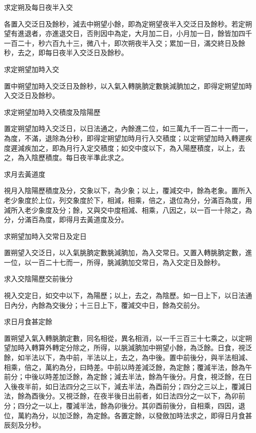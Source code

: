 \begin{pinyinscope}
 求定朔及每日夜半入交



 各置入交泛日及餘秒，減去中朔望小餘，即為定朔望夜半入交泛日及餘秒。若定朔望有進退者，亦進退交日，否則因中為定，大月加二日，小月加一日，餘皆加四千一百二十，秒六百九十三，微八十，即次朔夜半入交；累加一日，滿交終日及餘秒，去之，即每日夜半入交泛日及餘秒。



 求定朔望加時入交



 置中朔望加時入交泛日及餘秒，以入氣入轉朓朒定數朓減朒加之，即得定朔望加時入交泛日及餘秒。



 求定朔望加時入交積度及陰陽歷



 置定朔望加時入交泛日，以日法通之，內餘進二位，如三萬九千一百二十一而一，為度，不滿，退除為分秒，即得定朔望加時月行入交積度；以定朔望加時入轉遲疾度遲減疾加之，即為月行入定交積度；如交中度以下，為入陽歷積度，以上，去之，為入陰歷積度。每日夜半準此求之。



 求月去黃道度



 視月入陰陽歷積度及分，交象以下，為少象；以上，覆減交中，餘為老象。置所入老少象度於上位，列交象度於下，相減，相乘，倍之，退位為分，分滿百為度，用減所入老少象度及分；餘，又與交中度相減、相乘，八因之，以一百一十除之，為分，分滿百為度，即得月去黃道度及分。



 求朔望加時入交常日及定日



 置朔望入交泛日，以入氣朓朒定數朓減朒加，為入交常日。又置入轉朓朒定數，進一位，以一百二十七而一，所得，朓減朒加交常日，為入交定日及餘秒。



 求入交陰陽歷交前後分



 視入交定日，如交中以下，為陽歷；以上，去之，為陰歷。如一日上下，以日法通日內分，內餘為交後分；十三日上下，覆減交中日，餘為交前分。



 求日月食甚定餘



 置朔望入氣入轉朓朒定數，同名相從，異名相消，以一千三百三十七乘之，以定朔望加時入轉算外轉定分除之，所得，以朓減朒加中朔望小餘，為泛餘。日食，視泛餘，如半法以下，為中前，半法以上，去之，為中後。置中前後分，與半法相減、相乘，倍之，萬約為分，曰時差。中前以時差減泛餘，為定餘；覆減半法，餘為午前分；中後以時差加泛餘，為定餘；減去半法，餘為午後分。月食，視泛餘，在日入後夜半前，如日法四分之三以下，減去半法，為酉前分；四分之三以上，覆減日法，餘為酉後分。又視泛餘，在夜半後日出前者，如日法四分之一以下，為卯前分；四分之一以上，覆減半法，餘為卯後分。其卯酉前後分，自相乘，四因，退位，萬約為分，以加泛餘，為定餘。各置定餘，以發斂加時法求之，即得日月食甚辰刻及分秒。




\end{pinyinscope}
